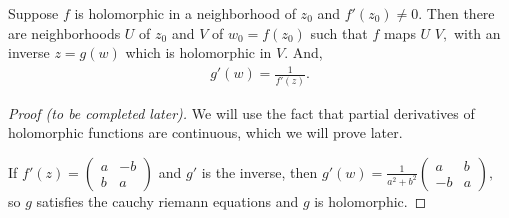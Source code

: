 \documentclass[a4paper,12pt]{article}
\begin{document}
\begin{theorem}
    Suppose $f$ is holomorphic in a neighborhood of $z_0$ and $f'(z_0)\neq0.$ Then there are neighborhoods $U$ of $z_0$ and $V$ of $w_0=f(z_0)$ such that $f$ maps $U$  $V,$ with an inverse $z=g(w)$ which is holomorphic in $V.$ And,\begin{align}
        g'(w)=\frac{1}{f'(z)}.
    \end{align}
    \begin{proof}[Proof (to be completed later)] We will use the fact that partial derivatives of holomorphic functions are continuous, which we will prove later.

    If $f'(z)=\begin{pmatrix}
        a&-b\\
        b&a
    \end{pmatrix}$
    and $g'$ is the inverse, then $g'(w)=\frac{1}{a^2+b^2}\begin{pmatrix}
        a&b\\
        -b&a
    \end{pmatrix},$ so $g$ satisfies the cauchy riemann equations and $g$ is holomorphic.
    \end{proof}
\end{theorem}
\end{document}

